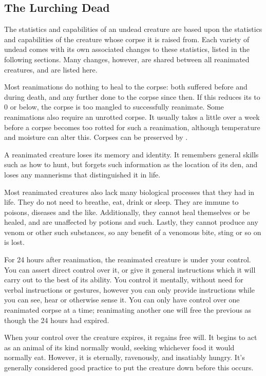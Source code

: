 \subsection{The Lurching Dead}

The statistics and capabilities of an undead creature are based upon the statistics and capabilities of the creature whose corpse it is raised from.
Each variety of undead comes with its own associated changes to these statistics, listed in the following sections.
Many changes, however, are shared between all reanimated creatures, and are listed here.

Most reanimations do nothing to heal {\damage} to the corpse: both {\damage} suffered before and during death, and any further {\damage} done to the corpse since then.
If this reduces its  to 0 or below, the corpse is too mangled to successfully reanimate.
Some reanimations also require an unrotted corpse.
It usually takes a little over a week before a corpse becomes too rotted for such a reanimation, although temperature and moisture can alter this.
Corpses can be preserved by {\embalming}.

A reanimated creature loses its memory and identity.
It remembers general skills such as how to hunt, but forgets such information as the location of its den, and loses any mannerisms that distinguished it in life.

Most reanimated creatures also lack many biological processes that they had in life.
They do not need to breathe, eat, drink or sleep.
They are immune to poisons, diseases and the like.
Additionally, they cannot heal themselves or be healed, and are unaffected by potions and such.
Lastly, they cannot produce any venom or other such substances, so any benefit of a venomous bite, sting or so on is lost.

For 24 hours after reanimation, the reanimated creature is under your control.
You can assert direct control over it, or give it general instructions which it will carry out to the best of its ability.
You control it mentally, without need for verbal instructions or gestures, however you can only provide instructions while you can see, hear or otherwise sense it.
You can only have control over one reanimated corpse at a time; reanimating another one will free the previous as though the 24 hours had expired.

When your control over the creature expires, it regains free will.
It begins to act as an animal of its kind normally would, seeking whichever food it would normally eat.
However, it is eternally, ravenously, and insatiably hungry.
It's generally considered good practice to put the creature down before this occurs.

